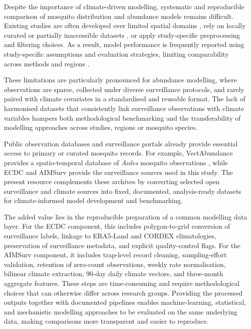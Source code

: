 \documentclass[11pt]{article}
\begin{document}
Despite the importance of climate-driven modelling, systematic and reproducible comparison of mosquito distribution and abundance models remains difficult. Existing studies are often developed over limited spatial domains \cite{guzzetta2016, Kioutsioukis2019, angelou2021, dare2022, dare2025, kinney2024rapid}, rely on locally curated or partially inaccessible datasets \cite{li2019}, or apply study-specific preprocessing and filtering choices. As a result, model performance is frequently reported using study-specific assumptions and evaluation strategies, limiting comparability across methods and regions \cite{davis2024,zardini2024}.

These limitations are particularly pronounced for abundance modelling, where observations are sparse, 
collected under diverse surveillance protocols, and rarely paired with climate covariates in a 
standardised and reusable format. The lack of harmonised datasets that consistently link 
surveillance observations with climate variables hampers both methodological benchmarking 
and the transferability of modelling approaches across studies, regions or mosquito species.

Public observation databases and surveillance portals already provide essential
access to primary or curated mosquito records. For example, VectAbundance
provides a spatio-temporal database of \textit{Aedes} mosquito observations
\cite{dare2024_vectabundance}, while ECDC and AIMSurv provide the surveillance
sources used in this study. The present resource complements these archives by
converting selected open surveillance and climate sources into fixed,
documented, analysis-ready datasets for climate-informed model development and
benchmarking.

The added value lies in the reproducible preparation of a common modelling data
layer. For the ECDC component, this includes polygon-to-grid conversion of
surveillance labels, linkage to ERA5-Land and CORDEX climatologies, preservation
of surveillance metadata, and explicit quality-control flags. For the AIMSurv
component, it includes trap-level record cleaning, sampling-effort validation,
retention of zero-count observations, weekly rate normalisation, bilinear
climate extraction, 90-day daily climate vectors, and three-month aggregate
features. These steps are time-consuming and require methodological choices
that can otherwise differ across research groups. Providing the processed
outputs together with documented pipelines enables machine-learning,
statistical, and mechanistic modelling approaches to be evaluated on the same
underlying data, making comparisons more transparent and easier to reproduce.
\end{document}
